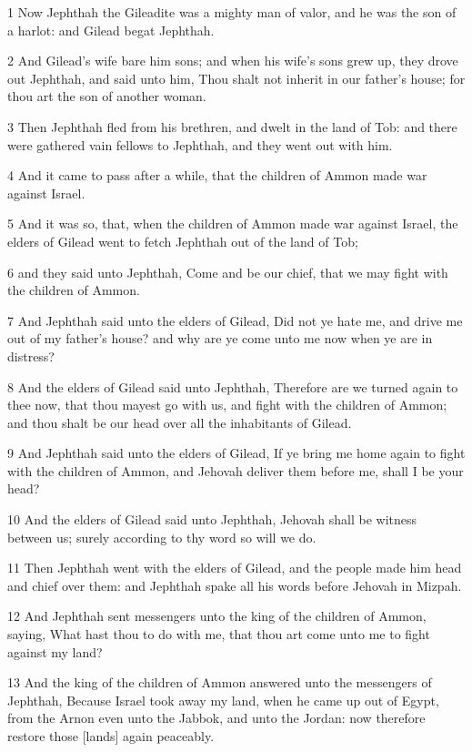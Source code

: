 \par 1 Now Jephthah the Gileadite was a mighty man of valor, and he was the son of a harlot: and Gilead begat Jephthah.
\par 2 And Gilead's wife bare him sons; and when his wife's sons grew up, they drove out Jephthah, and said unto him, Thou shalt not inherit in our father's house; for thou art the son of another woman.
\par 3 Then Jephthah fled from his brethren, and dwelt in the land of Tob: and there were gathered vain fellows to Jephthah, and they went out with him.
\par 4 And it came to pass after a while, that the children of Ammon made war against Israel.
\par 5 And it was so, that, when the children of Ammon made war against Israel, the elders of Gilead went to fetch Jephthah out of the land of Tob;
\par 6 and they said unto Jephthah, Come and be our chief, that we may fight with the children of Ammon.
\par 7 And Jephthah said unto the elders of Gilead, Did not ye hate me, and drive me out of my father's house? and why are ye come unto me now when ye are in distress?
\par 8 And the elders of Gilead said unto Jephthah, Therefore are we turned again to thee now, that thou mayest go with us, and fight with the children of Ammon; and thou shalt be our head over all the inhabitants of Gilead.
\par 9 And Jephthah said unto the elders of Gilead, If ye bring me home again to fight with the children of Ammon, and Jehovah deliver them before me, shall I be your head?
\par 10 And the elders of Gilead said unto Jephthah, Jehovah shall be witness between us; surely according to thy word so will we do.
\par 11 Then Jephthah went with the elders of Gilead, and the people made him head and chief over them: and Jephthah spake all his words before Jehovah in Mizpah.
\par 12 And Jephthah sent messengers unto the king of the children of Ammon, saying, What hast thou to do with me, that thou art come unto me to fight against my land?
\par 13 And the king of the children of Ammon answered unto the messengers of Jephthah, Because Israel took away my land, when he came up out of Egypt, from the Arnon even unto the Jabbok, and unto the Jordan: now therefore restore those [lands] again peaceably.
